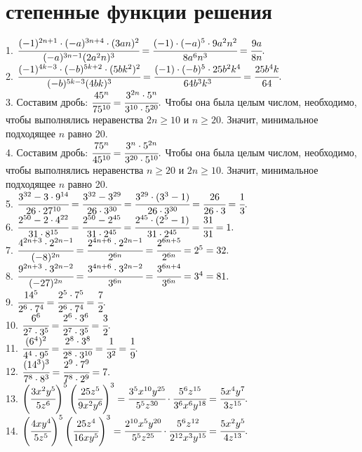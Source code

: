\section{степенные функции решения}
1. $\cfrac{(-1)^{2n+1}\cdot(-a)^{3n+4}\cdot(3an)^2}{(-a)^{3n-1}(2a^2n)^3}=
\cfrac{(-1)\cdot(-a)^{5}\cdot9a^2n^2}{8a^6n^3}=\cfrac{9a}{8n}.$\\
2. $\cfrac{(-1)^{4k-3}\cdot(-b)^{5k+2}\cdot(5bk^2)^2}{(-b)^{5k-3}(4bk)^3}=
\cfrac{(-1)\cdot(-b)^{5}\cdot25b^2k^4}{64b^3k^3}=\cfrac{25b^4k}{64}.$\\
3. Составим дробь: $\cfrac{45^n}{75^{10}}=\cfrac{3^{2n}\cdot5^n}{3^{10}\cdot5^{20}}.$ Чтобы она была целым числом, необходимо, чтобы выполнялись неравенства $2n\geqslant10$ и $n\geqslant20.$ Значит, минимальное подходящее $n$ равно 20.\\
4. Составим дробь: $\cfrac{75^n}{45^{10}}=\cfrac{3^{n}\cdot5^{2n}}{3^{20}\cdot5^{10}}.$ Чтобы она была целым числом, необходимо, чтобы выполнялись неравенства $n\geqslant20$ и $2n\geqslant10.$ Значит, минимальное подходящее $n$ равно 20.\\
5. $\cfrac{3^{32}-3\cdot 9^{14}}{26\cdot27^{10}}=\cfrac{3^{32}-3^{29}}{26\cdot3^{30}}=\cfrac{3^{29}\cdot(3^3-1)}{26\cdot3^{30}}=\cfrac{26}{26\cdot3}=\cfrac{1}{3}.$\\
6. $\cfrac{2^{50}-2\cdot4^{22}}{31\cdot8^{15}}=\cfrac{2^{50}-2^{45}}{31\cdot2^{45}}=\cfrac{2^{45}\cdot(2^5-1)}{31\cdot2^{45}}=\cfrac{31}{31}=1.$\\
7. $\cfrac{4^{2n+3}\cdot 2^{2n-1}}{(-8)^{2n}}=\cfrac{2^{4n+6}\cdot 2^{2n-1}}{2^{6n}}=\cfrac{2^{6n+5}}{2^{6n}}=2^5=32.$\\
8. $\cfrac{9^{2n+3}\cdot3^{2n-2}}{(-27)^{2n}}=\cfrac{3^{4n+6}\cdot3^{2n-2}}{3^{6n}}=\cfrac{3^{6n+4}}{3^{6n}}=3^4=81.$\\
9. $\cfrac{14^5}{2^6\cdot 7^4}=\cfrac{2^5\cdot7^5}{2^6\cdot 7^4}=\cfrac{7}{2}.$\\
10. $\cfrac{6^6}{2^7\cdot 3^5}=\cfrac{2^6\cdot3^6}{2^7\cdot 3^5}=\cfrac{3}{2}.$\\
11. $\cfrac{(6^4)^2}{4^4\cdot9^5}=\cfrac{2^8\cdot3^8}{2^8\cdot3^{10}}=\cfrac{1}{3^2}=\cfrac{1}{9}.$\\
12. $\cfrac{(14^3)^3}{7^8\cdot8^3}=\cfrac{2^9\cdot7^9}{7^8\cdot2^9}=7.$\\
13. $\left(\cfrac{3x^2y^5}{5z^6}\right)^5\left(\cfrac{25z^5}{9x^2y^6}\right)^3=\cfrac{3^5x^{10}y^{25}}{5^5z^{30}}\cdot\cfrac{5^6z^{15}}{3^6x^6y^{18}}=\cfrac{5x^4y^7}{3z^{15}}.$\\
14. $\left(\cfrac{4xy^4}{5z^5}\right)^5\left(\cfrac{25z^4}{16xy^5}\right)^3=\cfrac{2^{10}x^5y^{20}}{5^5z^{25}}\cdot\cfrac{5^6z^{12}}{2^{12}x^3y^{15}}=\cfrac{5x^2y^5}{4z^{13}}.$\\
